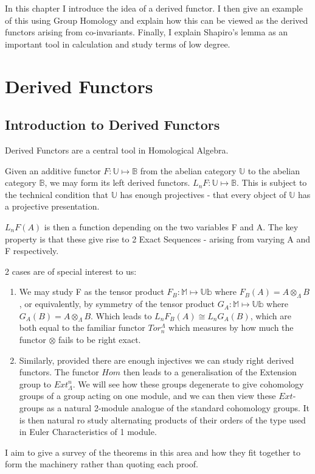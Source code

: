 In this chapter I introduce the idea of a derived functor. I then give an example of this using Group Homology and explain how this can be viewed as the derived functors arising from co-invariants. Finally, I explain Shapiro's lemma as an important tool in calculation and study terms of low degree.

\section{Derived Functors\label{df1}} 

\subsection{Introduction to Derived Functors}\label{df1.1}

Derived Functors are a central tool in Homological Algebra.

Given an additive functor $F:\mathbb{U} \mapsto \mathbb{B}$ from
the abelian category $\mathbb{U}$ to the abelian category
$\mathbb{B}$, we may form its left derived functors.
$L_nF:\mathbb{U} \mapsto \mathbb{B}$. This is subject to the
technical condition that $\mathbb{U}$ has enough projectives -
that every object of $\mathbb{U}$ has a projective presentation.

$L_nF(A)$ is then a function depending on the two variables F and
A. The key property is that these give rise to 2 Exact Sequences -
arising from varying A and F respectively.

2 cases are of special interest to us:
\begin{enumerate}
    \item We may study F as the tensor product $F_B: \mathbb M
    \mapsto \mathbb{Ub}$ where $F_B(A) = A\otimes_\Lambda B$, or
    equivalently, by symmetry of the tensor product $G_A: \mathbb M
    \mapsto \mathbb{Ub}$ where $G_A(B) = A\otimes_\Lambda B$.
    Which leads to $L_nF_B(A) \cong L_nG_A(B)$, which are both
    equal to the familiar functor $Tor_n^\Lambda$ which measures
    by how much the functor $\otimes$ fails to be right exact.

    \item  Similarly, provided there are enough injectives we can
    study right derived functors. The functor $Hom$ then leads to
    a generalisation of the Extension group to $Ext^n_\Lambda$. We
    will see how these groups degenerate to give cohomology groups
    of a group acting on one module, and we can then view these
    $Ext$-groups as a natural 2-module analogue of the standard
    cohomology groups. It is then natural ro study alternating
    products of their orders of the type used in Euler
    Characteristics of 1 module.
\end{enumerate}
I aim to give a survey of the theorems in this area and how they
fit together to  form the machinery rather than quoting each
proof.

